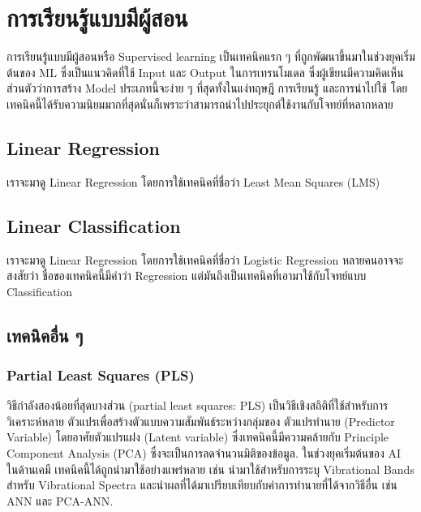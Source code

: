 

\chapter{การเรียนรู้แบบมีผู้สอน}
\label{ch:sup_ml}

การเรียนรู้แบบมีผู้สอนหรือ Supervised learning เป็นเทคนิคแรก ๆ ที่ถูกพัฒนาขึ้นมาในช่วงยุคเริ่มต้นของ ML ซึ่งเป็นแนวคิดที่ใช้ Input และ 
Output ในการเทรนโมเดล ซึ่งผู้เขียนมีความคิดเห็นส่วนตัวว่าการสร้าง Model ประเภทนี้จะง่าย ๆ ที่สุดทั้งในแง่ทฤษฎี การเรียนรู้ และการนำไปใช้ 
โดยเทคนิคนี้ได้รับความนิยมมากที่สุดนั่นก็เพราะว่าสามารถนำไปประยุกต์ใช้งานกับโจทย์ที่หลากหลาย

\section{Linear Regression}

เราจะมาดู Linear Regression โดยการใช้เทคนิคที่ชื่อว่า Least Mean Squares (LMS)

\section{Linear Classification}

เราจะมาดู Linear Regression โดยการใช้เทคนิคที่ชื่อว่า Logistic Regression หลายคนอาจจะสงสัยว่า ชื่อของเทคนิคนี้มีคำว่า Regression 
แต่มันถึงเป็นเทคนิคที่เอามาใช้กับโจทย์แบบ Classification

\section{เทคนิคอื่น ๆ}

\subsection{Partial Least Squares (PLS)}

วิธีกำลังสองน้อยที่สุดบางส่วน (partial least squares: PLS) 
เป็นวิธีเชิงสถิติที่ใช้สำหรับการวิเคราะห์หลาย ตัวแปรเพื่อสร้างตัวแบบความสัมพันธ์ระหว่างกลุ่มของ ตัวแปรทำนาย (Predictor Variable) 
โดยอาศัยตัวแปรแฝง (Latent variable) ซึ่งเทคนิคนี้มีความคล้ายกับ Principle Component Analysis (PCA) 
ซึ่งจะเป็นการลดจำนวนมิติของข้อมูล.\cite{wold1984} ในช่วงยุคเริ่มต้นของ AI ในด้านเคมี เทคนิคนี้ได้ถูกนำมาใช้อย่างแพร่หลาย เช่น 
นำมาใช้สำหรับการระบุ Vibrational Bands สำหรับ Vibrational Spectra และนำผลที่ได้มาเปรียบเทียบกับค่าการทำนายที่ได้จากวิธีอื่น เช่น
ANN และ PCA-ANN.

